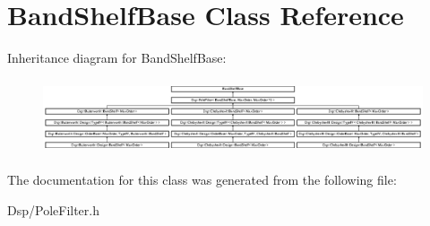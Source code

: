 \hypertarget{classBandShelfBase}{\section{Band\-Shelf\-Base Class Reference}
\label{classBandShelfBase}
}
Inheritance diagram for Band\-Shelf\-Base\-:\begin{figure}[H]
\begin{center}
\leavevmode
\includegraphics[height=2.217822cm]{classBandShelfBase}
\end{center}
\end{figure}


The documentation for this class was generated from the following file\-:\begin{DoxyCompactItemize}
\item 
Dsp/Pole\-Filter.\-h\end{DoxyCompactItemize}
